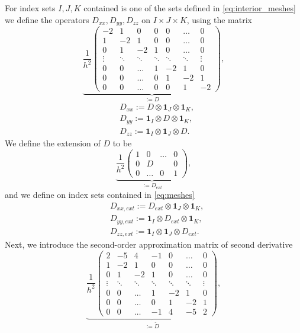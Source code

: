 \documentclass[12pt,reqno]{amsart}
\theoremstyle{definition}
\numberwithin{equation}{section}
\begin{document}
For  index sets $I,J,K$  contained is one of the sets defined in \eqref{eq:interior_meshes}
 we define the operators $D_{xx},D_{yy},D_{zz}$ on $I\times J\times K$, using the matrix 
$$
	\underbrace{
	\frac{1}{h^2}
	\begin{pmatrix}
		-2     & 1     & 0      & 0     & 0      & \dots  & 0      \\
		1     & -2     & 1      & 0      & 0      & \dots  & 0      \\
		0      & 1      & -2     & 1      & 0      & \dots  & 0      \\
		\vdots & \ddots & \ddots & \ddots & \ddots & \ddots & \vdots \\
		0      & 0      & \dots  & 1      & -2     & 1      & 0      \\
		0      & 0      & \dots  & 0      & 1      & -2    & 1      \\
		0      & 0      & \dots  & 0     & 0      & 1     & -2
\end{pmatrix}}_{:=D},
$$
\begin{align*}
	&
	D_{xx}:=D\otimes \mathbf{1}_J\otimes \mathbf{1}_K,\\&
D_{yy}:= \mathbf{1}_I\otimes D\otimes \mathbf{1}_K, \\&
D_{zz}:= \mathbf{1}_I\otimes \mathbf{1}_J\otimes D.
\end{align*}
We define the extension of $D$ to be 
$$
\underbrace{
	\frac{1}{h^2}
	\begin{pmatrix}
		1     & 0&\dots& 0  \\
		0&D &&0\\
		0&\dots&0&1
		\end{pmatrix}}_{:=D_{ext}},
$$
and we define on index sets contained in \eqref{eq:meshes}
\begin{align}\label{eq:ext}
	&
	D_{xx,ext}:=D_{ext}\otimes \mathbf{1}_J\otimes \mathbf{1}_K,\\& \nonumber
D_{yy,ext}:= \mathbf{1}_I\otimes D_{ext}\otimes \mathbf{1}_K, \\& \nonumber
D_{zz,ext}:= \mathbf{1}_I\otimes \mathbf{1}_J\otimes D_{ext}. \nonumber
\end{align}
Next, we introduce the second-order approximation matrix of second derivative 
$$
\underbrace{
	\frac{1}{h^2}
	\begin{pmatrix}
		2     & -5     & 4      & -1     & 0      & \dots  & 0      \\
		1     & -2     & 1      & 0      & 0      & \dots  & 0      \\
		0      & 1      & -2     & 1      & 0      & \dots  & 0      \\
		\vdots & \ddots & \ddots & \ddots & \ddots & \ddots & \vdots \\
		0      & 0      & \dots  & 1      & -2     & 1      & 0      \\
		0      & 0      & \dots  & 0      & 1      & -2    & 1      \\
		0      & 0      & \dots  & -1    & 4      & -5     & 2
\end{pmatrix}}_{:=\tilde{D}},
$$
\end{document}
